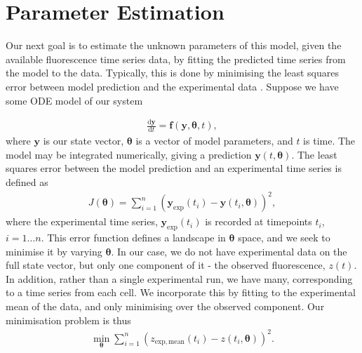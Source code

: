 \documentclass[10pt,journal]{./IEEE_latex_class/IEEEtran}
\begin{document}



\section{Parameter Estimation}
\label{Parameter Estimation}

Our next goal is to estimate the unknown parameters of this model, given the available fluorescence time series data, by fitting the predicted time series from the model to the data. Typically, this is done by minimising the least squares error between model prediction and the experimental data \cite{Brewer2008,Algorithms2003, Hu2015}. Suppose we have some ODE model of our system

\begin{align}
\frac{\mathrm{d}\mathbf{y}}{\mathrm{d}t} = \mathbf{f}(\mathbf{y},\boldsymbol{\theta},t),
\end{align}
where $\mathbf{y}$ is our state vector, $\boldsymbol{\theta}$ is a vector of model parameters, and $t$ is time. The model may be integrated numerically, giving a prediction $\mathbf{y}(t,\boldsymbol{\theta})$. The least squares error between the model prediction and an experimental time series is defined as
\begin{align}
J(\boldsymbol{\theta}) = \sum_{i =1}^{n} (\mathbf{y}_{\mathrm{exp}}(t_{i}) - \mathbf{y}(t_{i},\boldsymbol{\theta}))^2,
\end{align}
where the experimental time series, $\mathbf{y}_{\mathrm{exp}}(t_{i})$ is recorded at timepoints $t_{i}$, $i = 1 \hdots n$. This error function defines a landscape in $\boldsymbol{\theta}$ space, and we seek to minimise it by varying $\boldsymbol{\theta}$. In our case, we do not have experimental data on the full state vector, but only one component of it - the observed fluorescence, $z(t)$. In addition, rather than a single experimental run, we have many, corresponding to a time series from each cell. We incorporate this by fitting to the experimental mean of the data, and only minimising over the observed component. Our minimisation problem is thus
\begin{align}
\min_{\boldsymbol{\theta}} \sum_{i =1}^{n} (z_{\mathrm{exp, mean}}(t_{i}) - z(t_{i},\boldsymbol{\theta}))^2.
\end{align}
\end{document}
